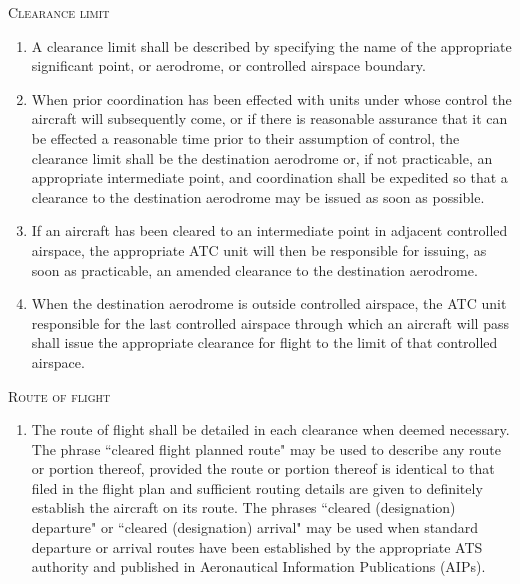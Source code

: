 \documentclass[../main.tex]{subfiles}
\begin{document}
    \begin{enumeratesc}
        \item \textsc{Clearance limit}
        \begin{enumerate}
            \item A clearance limit shall be described by specifying the name of the appropriate significant point, or aerodrome, or controlled airspace boundary.
            \item When prior coordination has been effected with units under whose control the aircraft will subsequently come, or if there is reasonable assurance that it can be effected a reasonable time prior to their assumption of control, the clearance limit shall be the destination aerodrome or, if not practicable, an appropriate intermediate point, and coordination shall be expedited so that a clearance to the destination aerodrome may be issued as soon as possible.
            \item If an aircraft has been cleared to an intermediate point in adjacent controlled airspace, the appropriate ATC unit will then be responsible for issuing, as soon as practicable, an amended clearance to the destination aerodrome.
            \item When the destination aerodrome is outside controlled airspace, the ATC unit responsible for the last controlled airspace through which an aircraft will pass shall issue the appropriate clearance for flight to the limit of that controlled airspace.
        \end{enumerate}

        \item \textsc{Route of flight}
        \begin{enumerate}
            \item The route of flight shall be detailed in each clearance when deemed necessary. The phrase ``cleared flight planned route" may be used to describe any route or portion thereof, provided the route or portion thereof is identical to that filed in the flight plan and sufficient routing details are given to definitely establish the aircraft on its route. The phrases ``cleared (designation) departure" or ``cleared (designation) arrival" may be used when standard departure or arrival routes have been established by the appropriate ATS authority and published in Aeronautical Information Publications (AIPs).



\end{enumerate}
\end{enumeratesc}
\end{document}
